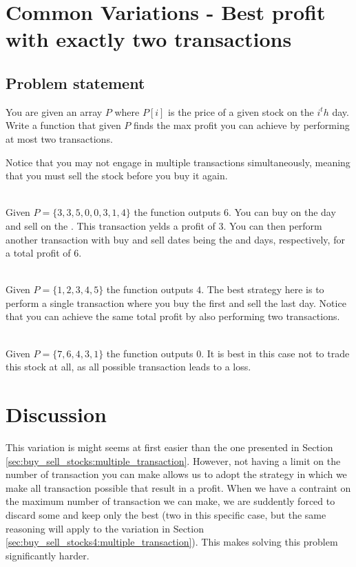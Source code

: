\section{Common Variations - Best profit with exactly two transactions}
\label{sec:buy_sell_stocks3:intro}

\subsection{Problem statement}
\begin{exercise}
	You are given an array $P$ where $P[i]$ is the price of a given stock on the $i^th$ day.
	Write a function that given $P$ finds the max profit you can achieve by performing at most two transactions.
		
	Notice that you may not engage in multiple transactions simultaneously, meaning that you must sell the stock before you buy it again.
	
	 
	\begin{example}
	\label{ex:buy_sell_stocks_3:exmaple1}
		\hfill \\
		Given $P=\{3,3,5,0,0,3,1,4\}$ the function outputs $6$. 
		You can buy on the  day and sell on the . This transaction yelds a profit of $3$.
		You can then perform another transaction with buy and sell dates being the  and  days, respectively, for a total profit of $6$.
	\end{example}

	\begin{example}
		\label{ex:buy_sell_stocks_3:exmaple2}
			\hfill \\
			Given $P=\{1,2,3,4,5\}$ the function outputs $4$. 
			The best strategy here is to perform a single transaction where you buy the first and sell the last day. Notice that you can achieve the same total profit by also performing two transactions.
	\end{example}

	\begin{example}
		\label{ex:buy_sell_stocks_3:exmaple3}
			\hfill \\
			Given $P=\{7,6,4,3,1\}$ the function outputs $0$. 
			It is best in this case not to trade this stock at all, as all possible transaction leads to a loss.
	\end{example}
\end{exercise}


\section{Discussion}
\label{buy_sell_stocks_3:sec:discussion}
This variation is might seems at first easier than the one presented in Section \ref{sec:buy_sell_stocks:multiple_transaction}. 
However, not having a limit on the number of transaction you can make allows us to adopt the strategy in which we make 
all transaction possible that result in a profit. 
When we have a contraint on the maximum number of transaction we can make, we are suddently forced to discard some and keep only the best (two in this specific case, but the same reasoning will apply to the variation in Section \ref{sec:buy_sell_stocks4:multiple_transaction}).
This makes solving this problem significantly harder.


